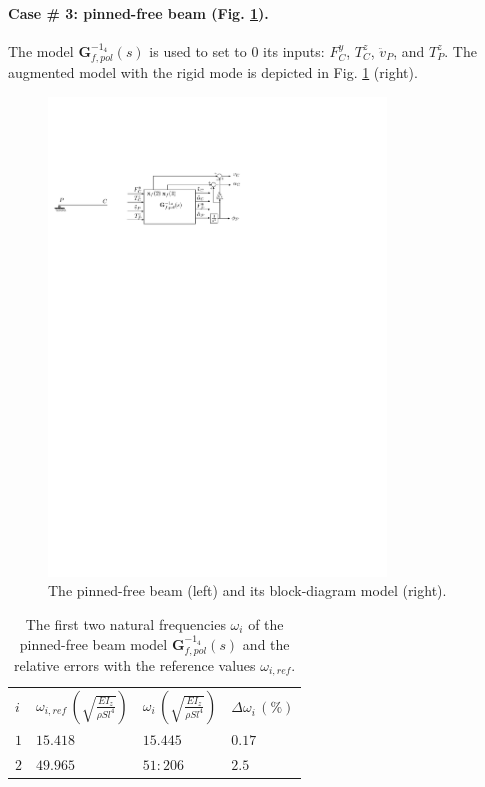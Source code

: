 \documentclass[smallcondensed]{svjour3}     %
\begin{document}
\FloatBarrier
\paragraph{Case \# 3: pinned-free beam (Fig. \ref{fig:Tpf}).} The model $\mathbf{G}_{f,pol}^{-1_{4}}(s)$ is used to set to $0$ its inputs: $F^y_C$, $T^z_C$, $\ddot{v}_P$, and $T^z_P$. The augmented model with the rigid mode is depicted in Fig. \ref{fig:Tpf} (right).
\begin{figure}[htbp!]
  \includegraphics[width=0.8\textwidth]{Tpfb}
\caption{The pinned-free beam (left) and its block-diagram model (right).}
\label{fig:Tpf} 
\end{figure}
\begin{table}[htbp!]
\caption{The first two natural frequencies $\omega_i$ of the pinned-free beam model $\mathbf{G}_{f,pol}^{-1_{4}}(s)$ and the relative errors with the reference values $\omega_{i,ref}$.}
\label{tab:Tpf}       %
\begin{tabular}{llll}
\hline\noalign{\smallskip}
  $i$ & $\omega_{i,ref}\,\left(\sqrt{\frac{EI_z}{\rho S l^4}}\right)$ &  $\omega_i\,\left(\sqrt{\frac{EI_z}{\rho S l^4}}\right)$ &  $\Delta \omega_i\,(\%)$ \\
\noalign{\smallskip}\hline\noalign{\smallskip}
$1$ & $15.418$ & $15.445$  & $0.17$ \\ 
$2$ & $49.965$ & $51:206$ & $2.5$ \\
\hline
\end{tabular}
\end{table}
\end{document}
